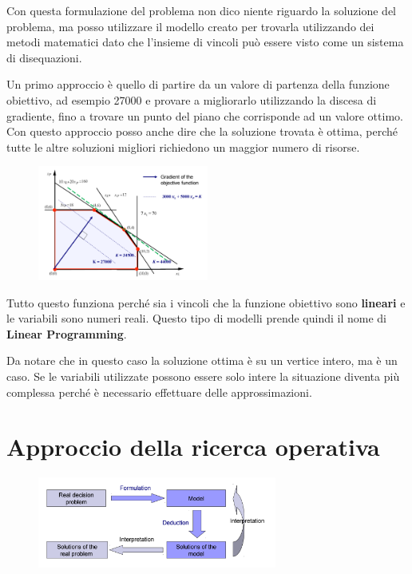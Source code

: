 Con questa formulazione del problema non dico niente riguardo la soluzione del problema, ma posso utilizzare il modello creato per trovarla utilizzando dei metodi matematici dato che l'insieme di vincoli può essere visto come un sistema di disequazioni.

Un primo approccio è quello di partire da un valore di partenza della funzione obiettivo, ad esempio 27000 e provare a migliorarlo utilizzando la discesa di gradiente, fino a trovare un punto del piano che corrisponde ad un valore ottimo.
Con questo approccio posso anche dire che la soluzione trovata è ottima, perché tutte le altre soluzioni migliori richiedono un maggior numero di risorse.

\begin{figure}[htbp]
	\centering
	\includegraphics[width=0.5\textwidth]{images/l1-poligono.png}
\end{figure}


Tutto questo funziona perché sia i vincoli che la funzione obiettivo sono \textbf{lineari} e le variabili sono numeri reali. Questo tipo di modelli prende quindi il nome di \textbf{Linear Programming}.

Da notare che in questo caso la soluzione ottima è su un vertice intero, ma è un caso. Se le variabili utilizzate possono essere solo intere la situazione diventa più complessa perché è necessario effettuare delle approssimazioni.

\section{Approccio della ricerca operativa}

\begin{figure}[htbp]
	\centering
	\includegraphics[width=0.7\textwidth]{images/l1-approccio.png}
\end{figure}

